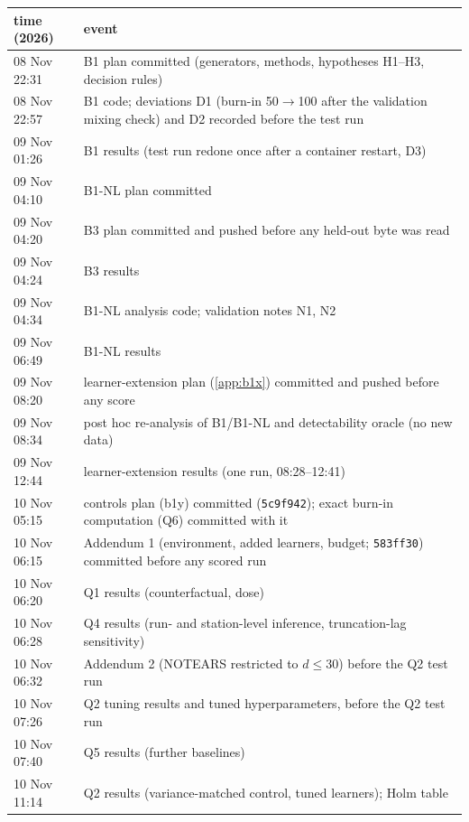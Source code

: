 \begin{center}\small
\begin{tabular}{p{}p{}}
\toprule
time (2026) & event \\
\midrule
08 Nov 22:31 & B1 plan committed (generators, methods, hypotheses H1--H3, decision rules) \\
08 Nov 22:57 & B1 code; deviations D1 (burn-in 50$\to$100 after the validation mixing check) and D2 recorded before the test run \\
09 Nov 01:26 & B1 results (test run redone once after a container restart, D3) \\
09 Nov 04:10 & B1-NL plan committed \\
09 Nov 04:20 & B3 plan committed and pushed before any held-out byte was read \\
09 Nov 04:24 & B3 results \\
09 Nov 04:34 & B1-NL analysis code; validation notes N1, N2 \\
09 Nov 06:49 & B1-NL results \\
09 Nov 08:20 & learner-extension plan (\cref{app:b1x}) committed and pushed before any score \\
09 Nov 08:34 & post hoc re-analysis of B1/B1-NL and detectability oracle (no new data) \\
09 Nov 12:44 & learner-extension results (one run, 08:28--12:41) \\
10 Nov 05:15 & controls plan (b1y) committed (\texttt{5c9f942}); exact burn-in computation (Q6) committed with it \\
10 Nov 06:15 & Addendum 1 (environment, added learners, budget; \texttt{583ff30}) committed before any scored run \\
10 Nov 06:20 & Q1 results (counterfactual, dose) \\
10 Nov 06:28 & Q4 results (run- and station-level inference, truncation-lag sensitivity) \\
10 Nov 06:32 & Addendum 2 (NOTEARS restricted to $d\le30$) before the Q2 test run \\
10 Nov 07:26 & Q2 tuning results and tuned hyperparameters, before the Q2 test run \\
10 Nov 07:40 & Q5 results (further baselines) \\
10 Nov 11:14 & Q2 results (variance-matched control, tuned learners); Holm table \\
\bottomrule
\end{tabular}
\end{center}



